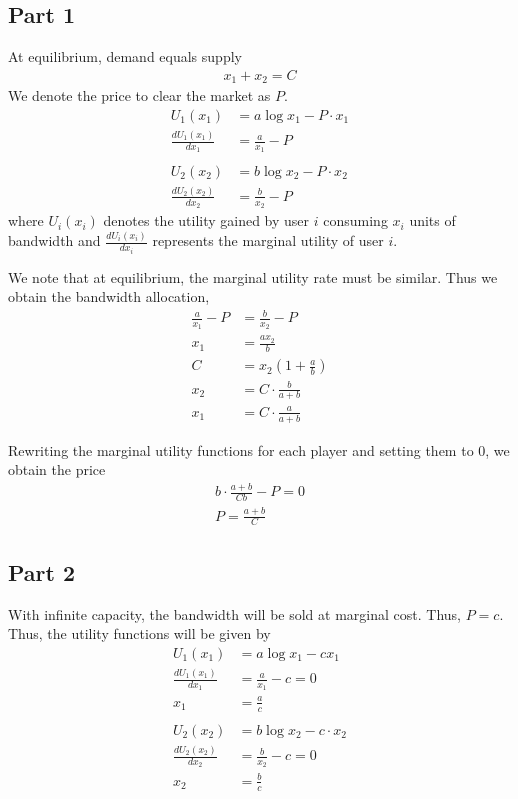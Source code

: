\documentclass[]{article}
\newcommand{\e}{&=}
\begin{document}
\subsection*{Part 1}

At equilibrium, demand equals supply
\begin{align*}
x_1 + x_2 = C
\end{align*}
We denote the price to clear the market as $P$.
\begin{align*}
U_1(x_1) \e a \log x_1 - P \cdot x_1 \\
\frac{dU_1(x_1)}{dx_1} \e \frac{a}{x_1} - P \\ \\
U_2(x_2) \e b \log x_2 - P \cdot x_2 \\
\frac{dU_2(x_2)}{dx_2} \e \frac{b}{x_2} - P 
\end{align*}
where $U_i(x_i)$ denotes the utility gained by user $i$ consuming $x_i$ units of bandwidth and $\frac{dU_i(x_i)}{dx_i}$ represents the marginal utility of user $i$.

We note that at equilibrium, the marginal utility rate must be similar. Thus we obtain the bandwidth allocation,
\begin{align*}
\frac{a}{x_1} - P \e \frac{b}{x_2} - P \\
x_1 \e \frac{a x_2}{b} \\
C \e x_2 (1 + \frac{a}{b}) \\
x_2 \e C \cdot \frac{b}{a + b} \\
x_1 \e C \cdot \frac{a}{a + b}
\end{align*}

Rewriting the marginal utility functions for each player and setting them to 0, we obtain the price
\begin{gather*}
b \cdot \frac{a + b}{C b} - P = 0 \\
P = \frac{a + b}{C}
\end{gather*}

\subsection*{Part 2}

With infinite capacity, the bandwidth will be sold at marginal cost. Thus, $P = c$. Thus, the utility functions will be given by
\begin{align*}
U_1(x_1) \e a \log x_1 - cx_1 \\
\frac{dU_1(x_1)}{dx_1} \e \frac{a}{x_1} - c = 0 \\ 
x_1 \e \frac{a}{c} \\ \\
U_2(x_2) \e b \log x_2 - c \cdot x_2 \\
\frac{dU_2(x_2)}{dx_2} \e \frac{b}{x_2} - c = 0 \\
x_2 \e \frac{b}{c} 
\end{align*}
\end{document}
